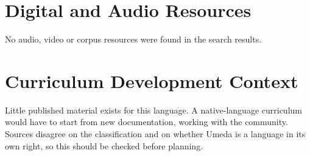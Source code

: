 \documentclass[12pt]{article}
\begin{document}
\section{Digital and Audio Resources}
No audio, video or corpus resources were found in the search results.

\section{Curriculum Development Context}
Little published material exists for this language. A native-language curriculum would have to start from new documentation, working with the community. Sources disagree on the classification and on whether Umeda is a language in its own right, so this should be checked before planning.
\end{document}

